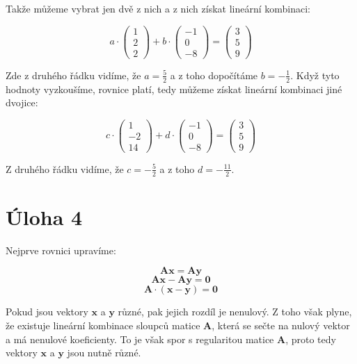 \documentclass{fkssolpub}
\begin{document}
Takže můžeme vybrat jen dvě z nich a z nich získat lineární kombinaci:

\[
	a \cdot
	\begin{pmatrix}
		1 \\ 2 \\ 2
	\end{pmatrix}
	+ b \cdot
	\begin{pmatrix}
		-1 \\ 0 \\ -8
	\end{pmatrix}
	=
	\begin{pmatrix}
		3 \\ 5 \\ 9
	\end{pmatrix}
\]

Zde z druhého řádku vidíme, že $a = \frac{5}{2}$ a z toho dopočítáme $b = - \frac{1}{2}$. Když tyto hodnoty vyzkoušíme, rovnice platí, tedy můžeme získat lineární kombinaci jiné dvojice:

\[
	c \cdot
	\begin{pmatrix}
		1 \\ -2 \\ 14
	\end{pmatrix}
	+ d \cdot
	\begin{pmatrix}
		-1 \\ 0 \\ -8
	\end{pmatrix}
	=
	\begin{pmatrix}
		3 \\ 5 \\ 9
	\end{pmatrix}
\]

Z druhého řádku vidíme, že $c = - \frac{5}{2}$ a z toho $d = - \frac{11}{2}$.


\section{Úloha 4}

Nejprve rovnici upravíme:

\[
	\mathbf{A} \mathbf{x} = \mathbf{A} \mathbf{y}
\]
\[
	\mathbf{A} \mathbf{x} - \mathbf{A} \mathbf{y} = \mathbf{0}
\]
\[
	\mathbf{A} \cdot (\mathbf{x} - \mathbf{y}) = \mathbf{0}
\]

Pokud jsou vektory $\mathbf{x}$ a $\mathbf{y}$ různé, pak jejich rozdíl je nenulový. Z toho však plyne, že existuje lineární kombinace sloupců matice $\mathbf{A}$, která se sečte na nulový vektor a má nenulové koeficienty. To je však spor s regularitou matice $\mathbf{A}$, proto tedy vektory $\mathbf{x}$ a $\mathbf{y}$ jsou nutně různé.
\end{document}
